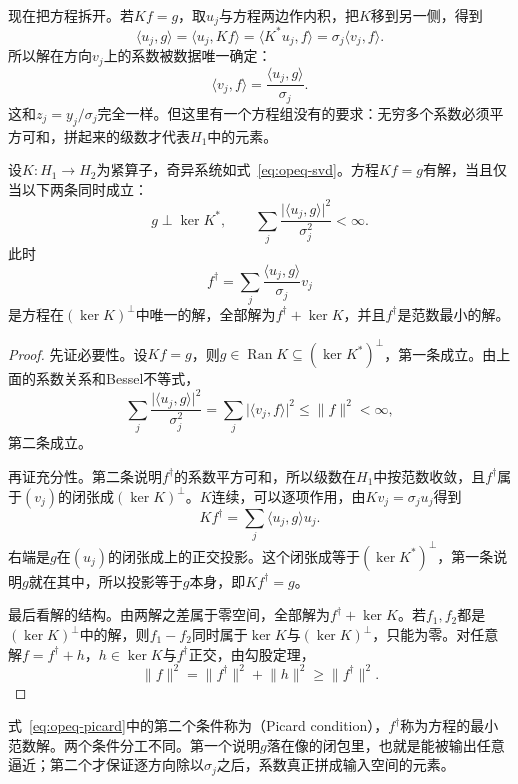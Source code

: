 现在把方程拆开。若$Kf=g$，取$u_j$与方程两边作内积，把$K$移到另一侧，得到
\[
  \langle u_j,g\rangle
  =\langle u_j,Kf\rangle
  =\langle K^*u_j,f\rangle
  =\sigma_j\langle v_j,f\rangle.
\]
所以解在方向$v_j$上的系数被数据唯一确定：
\[
  \langle v_j,f\rangle=\frac{\langle u_j,g\rangle}{\sigma_j}.
\]
这和$z_j=y_j/\sigma_j$完全一样。但这里有一个方程组没有的要求：无穷多个系数必须平方可和，拼起来的级数才代表$H_1$中的元素。

\begin{theorem}[第一类方程的可解条件与最小范数解]
\label{thm:opeq-picard}
设$K:H_1\to H_2$为紧算子，奇异系统如式~\eqref{eq:opeq-svd}。方程$Kf=g$有解，当且仅当以下两条同时成立：
\begin{equation}
  g\perp\ker K^*,\qquad
  \sum_j\frac{\lvert\langle u_j,g\rangle\rvert^2}{\sigma_j^2}<\infty.
  \label{eq:opeq-picard}
\end{equation}
此时
\begin{equation}
  f^\dagger=\sum_j\frac{\langle u_j,g\rangle}{\sigma_j}v_j
  \label{eq:opeq-min-norm}
\end{equation}
是方程在$(\ker K)^\perp$中唯一的解，全部解为$f^\dagger+\ker K$，并且$f^\dagger$是范数最小的解。
\end{theorem}

\begin{proof}
先证必要性。设$Kf=g$，则$g\in\operatorname{Ran}K\subseteq(\ker K^*)^\perp$，第一条成立。由上面的系数关系和Bessel不等式，
\[
  \sum_j\frac{\lvert\langle u_j,g\rangle\rvert^2}{\sigma_j^2}
  =\sum_j\lvert\langle v_j,f\rangle\rvert^2
  \leq\lVert f\rVert^2<\infty,
\]
第二条成立。

再证充分性。第二条说明$f^\dagger$的系数平方可和，所以级数在$H_1$中按范数收敛，且$f^\dagger$属于$(v_j)$的闭张成$(\ker K)^\perp$。$K$连续，可以逐项作用，由$Kv_j=\sigma_ju_j$得到
\[
  Kf^\dagger=\sum_j\langle u_j,g\rangle u_j.
\]
右端是$g$在$(u_j)$的闭张成上的正交投影。这个闭张成等于$(\ker K^*)^\perp$，第一条说明$g$就在其中，所以投影等于$g$本身，即$Kf^\dagger=g$。

最后看解的结构。由两解之差属于零空间，全部解为$f^\dagger+\ker K$。若$f_1,f_2$都是$(\ker K)^\perp$中的解，则$f_1-f_2$同时属于$\ker K$与$(\ker K)^\perp$，只能为零。对任意解$f=f^\dagger+h$，$h\in\ker K$与$f^\dagger$正交，由勾股定理，
\[
  \lVert f\rVert^2=\lVert f^\dagger\rVert^2+\lVert h\rVert^2\geq\lVert f^\dagger\rVert^2.
\]
\end{proof}

式~\eqref{eq:opeq-picard}中的第二个条件称为（Picard condition），$f^\dagger$称为方程的最小范数解。两个条件分工不同。第一个说明$g$落在像的闭包里，也就是能被输出任意逼近；第二个才保证逐方向除以$\sigma_j$之后，系数真正拼成输入空间的元素。

